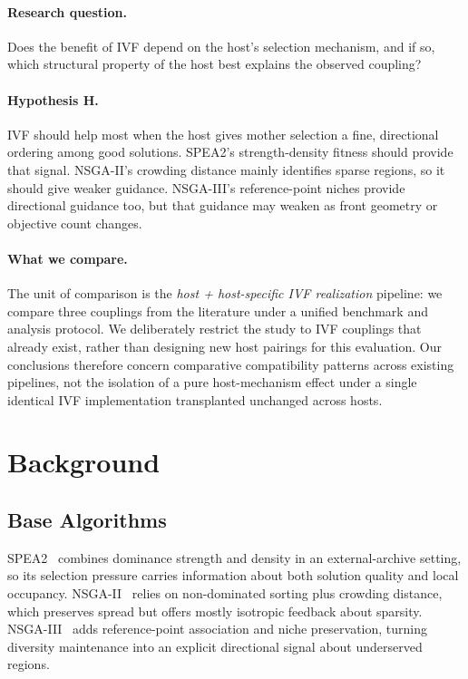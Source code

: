 \documentclass[runningheads]{llncs}
\begin{document}
\paragraph{Research question.}
Does the benefit of IVF depend on the host's selection mechanism, and if so, which structural property of the host best explains the observed coupling?

\paragraph{Hypothesis H.}
IVF should help most when the host gives mother selection a fine, directional ordering among good solutions. SPEA2's strength-density fitness should provide that signal. NSGA-II's crowding distance mainly identifies sparse regions, so it should give weaker guidance. NSGA-III's reference-point niches provide directional guidance too, but that guidance may weaken as front geometry or objective count changes.

\paragraph{What we compare.}
The unit of comparison is the \emph{host + host-specific IVF realization} pipeline: we compare three couplings from the literature under a unified benchmark and analysis protocol. We deliberately restrict the study to IVF couplings that already exist, rather than designing new host pairings for this evaluation. Our conclusions therefore concern comparative compatibility patterns across existing pipelines, not the isolation of a pure host-mechanism effect under a single identical IVF implementation transplanted unchanged across hosts.

\section{Background}
\label{sec:background}

\subsection{Base Algorithms}
\label{sec:base_algos}

SPEA2~\cite{zitzler2001spea2} combines dominance strength and density in an external-archive setting, so its selection pressure carries information about both solution quality and local occupancy. NSGA-II~\cite{deb2002nsga2} relies on non-dominated sorting plus crowding distance, which preserves spread but offers mostly isotropic feedback about sparsity. NSGA-III~\cite{deb2014nsga3} adds reference-point association and niche preservation, turning diversity maintenance into an explicit directional signal about underserved regions.
\end{document}
